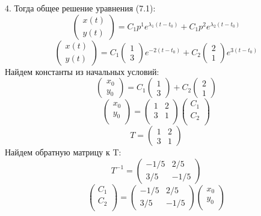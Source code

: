 \documentclass[10pt]{report}
\begin{document}
4. Тогда общее решение уравнения (7.1):
\begin{equation}
\left(
\begin{array}{c}
x(t)\\
y(t)
\end{array}
\right)
=C_1p^1e^{\lambda_1(t-t_0)}+C_1p^2e^{\lambda_2(t-t_0)}
\end{equation}
\[\left(
\begin{array}{c}
x(t)\\
y(t)
\end{array}
\right)
=C_1
\left(
\begin{array}{c}
1\\
3
\end{array}
\right)
e^{-2(t-t_0)}+C_2
\left(
\begin{array}{c}
2\\
1
\end{array}
\right)
e^{3(t-t_0)}
\]
Найдем константы из начальных условий:
\[\left(
\begin{array}{c}
x_0\\
y_0
\end{array}
\right)
=C_1
\left(
\begin{array}{c}
1\\
3
\end{array}
\right)+C_2
\left(
\begin{array}{c}
2\\
1
\end{array}
\right)
\]
\[
\left(
\begin{array}{c}
x_0\\
y_0\\
\end{array}
\right)
 = \left(
\begin{array}{cc}
1 & 2\\
3 & 1\\
\end{array}
\right)
\left(
\begin{array}{cc}
C_1\\
C_2\\
\end{array}
\right)
\]
\[ T= \left(
\begin{array}{cc}
1 & 2\\
3 & 1
\end{array}
\right)\]
Найдем обратную матрицу к T:
\[T^{-1}  = \left(
\begin{array}{cc}
-1/5 & 2/5\\
3/5 & -1/5
\end{array}
\right)\]
\[
\left(
\begin{array}{c}
C_1\\
C_2\\
\end{array}
\right)
 = \left(
\begin{array}{cc}
-1/5 & 2/5\\
3/5 & -1/5
\end{array}
\right)
\left(
\begin{array}{cc}
x_0\\
y_0\\
\end{array}
\right)
\]
\end{document}
